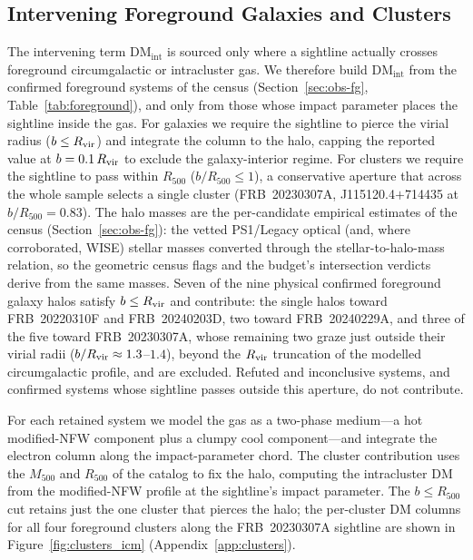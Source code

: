 \subsection{Intervening Foreground Galaxies and Clusters}
\label{sec:foreground}

The intervening term $\mathrm{DM_{int}}$ is sourced only where a sightline
actually crosses foreground circumgalactic or intracluster gas. We therefore
build $\mathrm{DM_{int}}$ from the confirmed foreground systems of the census
(Section~\ref{sec:obs-fg}, Table~\ref{tab:foreground}), and only from those
whose impact parameter places the sightline inside the gas. For galaxies we
require the sightline to pierce the virial radius ($b\le R_{\rm vir}$) and
integrate the column to the halo, capping the reported value at $b = 0.1\,R_{\rm
vir}$ to exclude the galaxy-interior regime. For clusters we require the
sightline to pass within $R_{500}$ ($b/R_{500}\le 1$), a conservative aperture
that across the whole sample selects a single cluster (FRB~20230307A,
J115120.4$+$714435 at $b/R_{500}=0.83$). The halo masses are the
per-candidate empirical estimates of the census (Section~\ref{sec:obs-fg}):
the vetted PS1/Legacy optical (and, where corroborated, WISE) stellar masses
converted through the \citet{Moster2013} stellar-to-halo-mass relation, so
the geometric census flags and the budget's intersection verdicts derive
from the same masses. Seven of the nine physical confirmed foreground galaxy
halos satisfy $b\le R_{\rm vir}$ and contribute: the single halos toward
FRB~20220310F and FRB~20240203D, two toward FRB~20240229A, and three of the
five toward FRB~20230307A, whose remaining two graze just outside their
virial radii ($b/R_{\rm vir}\approx1.3$--$1.4$), beyond the $R_{\rm vir}$
truncation of the modelled circumgalactic profile, and are excluded.
Refuted and inconclusive systems, and confirmed
systems whose sightline passes outside this aperture, do not contribute.

For each retained system we model the gas as a two-phase medium---a hot
modified-NFW component \citep{ProchaskaZheng2019} plus a clumpy cool
component---and integrate the electron column along the impact-parameter chord.
The cluster contribution uses the $M_{500}$ and $R_{500}$ of the
\citet{WenHan2024} catalog to fix the halo, computing the intracluster DM from
the modified-NFW profile at the sightline's impact parameter.
The $b\le R_{500}$ cut retains just the one cluster that pierces the halo; the
per-cluster DM columns for all four foreground clusters along the
FRB~20230307A sightline are shown in Figure~\ref{fig:clusters_icm}
(Appendix~\ref{app:clusters}).


